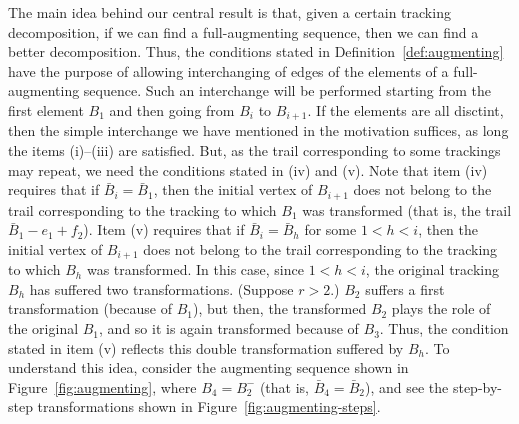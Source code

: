 \documentclass[12pt,reqno,a4paper]{amsart}
\newcommand{\full}{full}
\begin{document}
The main idea behind our central result is that, given a
  certain tracking decomposition, if we can find a \full-augmenting
  sequence, then we can find a better decomposition.  Thus, the
  conditions stated in Definition~\ref{def:augmenting} have the purpose
  of allowing interchanging of edges of the elements of a
  \full-augmenting sequence. Such an interchange will be performed
  starting from the first element $B_1$ and then going from $B_i$ to
  $B_{i+1}$. If the elements are all disctint, then the simple
  interchange we have mentioned in the motivation suffices, as long
  the items (i)--(iii) are satisfied. But, as the trail corresponding
  to some trackings may repeat, we need the conditions stated in (iv)
  and (v). Note that item (iv) requires that if
  \(\bar B_i = \bar B_{1}\),
  then the initial vertex of $B_{i+1}$ does not belong to the trail
  corresponding to the tracking to which $B_1$ was transformed 
  (that is, the trail $\bar B_1 - e_1 + f_2$). 
 Item (v) requires that if \(\bar B_{i} = \bar B_{h}\) for some
 $1<h<i$, then the initial vertex of $B_{i+1}$ does not belong to the
 trail corresponding to the tracking to which $B_h$ was transformed.
 In this case, since $1<h<i$, the original tracking $B_h$ has suffered
 two transformations. (Suppose $r>2$.)  $B_2$ suffers a first transformation (because of
 $B_1$), but then, the transformed $B_2$ plays the role of the
 original $B_1$, and so it is again transformed because of
 $B_3$. Thus, the condition stated in item (v) reflects this double
 transformation suffered by $B_h$. To understand this idea, consider
 the augmenting sequence shown in Figure~\ref{fig:augmenting}, where $B_4=B_2^-$ (that
 is, $\bar B_4 = \bar B_2$), and see the step-by-step transformations
 shown in Figure~\ref{fig:augmenting-steps}. 
\end{document}
